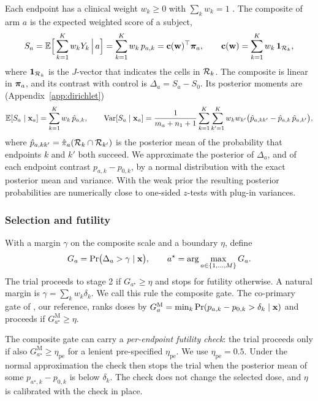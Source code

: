 Each endpoint has a clinical weight $w_k\ge0$ with $\sum_kw_k=1$ \citep{zaslavsky2013}. The composite of arm $a$ is the expected weighted score of a subject,
\begin{equation}\label{eq:composite}
S_a=\mathbb{E}\Big[\sum_{k=1}^K w_kY_k\,\Big|\,a\Big]=\sum_{k=1}^K w_k\,p_{a,k}=\mathbf{c}(\mathbf{w})^\top\bm{\pi}_a,\qquad
\mathbf{c}(\mathbf{w})=\sum_{k=1}^K w_k\,\mathbf{1}_{\mathcal{R}_k},
\end{equation}
where $\mathbf{1}_{\mathcal{R}_k}$ is the $J$-vector that indicates the cells in $\mathcal{R}_k$. The composite is linear in $\bm{\pi}_a$, and its contrast with control is $\Delta_a=S_a-S_0$. Its posterior moments are (Appendix~\ref{app:dirichlet})
\begin{equation}\label{eq:moments}
\mathbb{E}[S_a\mid\mathbf{x}_a]=\sum_{k=1}^K w_k\,\hat p_{a,k},\qquad
\mathrm{Var}[S_a\mid\mathbf{x}_a]=\frac{1}{m_a+n_1+1}\sum_{k=1}^K\sum_{k'=1}^K w_kw_{k'}\big(\hat p_{a,kk'}-\hat p_{a,k}\,\hat p_{a,k'}\big),
\end{equation}
where $\hat p_{a,kk'}=\hat\pi_a(\mathcal{R}_k\cap\mathcal{R}_{k'})$ is the posterior mean of the probability that endpoints $k$ and $k'$ both succeed. We approximate the posterior of $\Delta_a$, and of each endpoint contrast $p_{a,k}-p_{0,k}$, by a normal distribution with the exact posterior mean and variance. With the weak prior the resulting posterior probabilities are numerically close to one-sided $z$-tests with plug-in variances.

\subsubsection{Selection and futility}
With a margin $\gamma$ on the composite scale and a boundary $\eta$, define
\begin{equation}\label{eq:gate}
G_a=\mathrm{Pr}\big(\Delta_a>\gamma\mid\mathbf{x}\big),\qquad
a^\star=\arg\max_{a\in\{1,\dots,M\}}G_a .
\end{equation}
The trial proceeds to stage 2 if $G_{a^\star}\ge\eta$ and stops for futility otherwise. A natural margin is $\gamma=\sum_k w_k\delta_k$. We call this rule the composite gate. The co-primary gate of \citet{yang2024}, our reference, ranks doses by $G^{\mathrm{M}}_a=\min_k\mathrm{Pr}(p_{a,k}-p_{0,k}>\delta_k\mid\mathbf{x})$ and proceeds if $G^{\mathrm{M}}_{a^\star}\ge\eta$.

The composite gate can carry a \emph{per-endpoint futility check}: the trial proceeds only if also $G^{\mathrm{M}}_{a^\star}\ge\eta_{\mathrm{pe}}$ for a lenient pre-specified $\eta_{\mathrm{pe}}$. We use $\eta_{\mathrm{pe}}=0.5$. Under the normal approximation the check then stops the trial when the posterior mean of some $p_{a^\star,k}-p_{0,k}$ is below $\delta_k$. The check does not change the selected dose, and $\eta$ is calibrated with the check in place.

